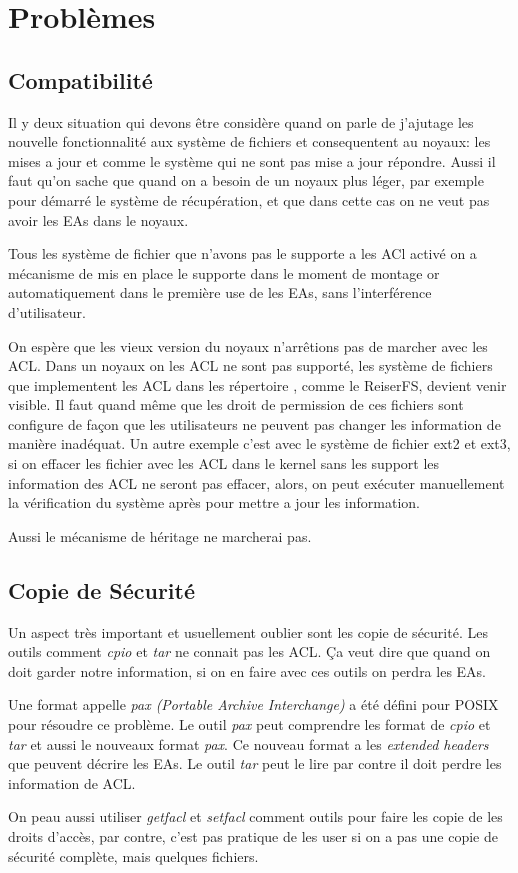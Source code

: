 \section*{Problèmes}

\subsection*{Compatibilité}

Il y deux situation qui devons être considère quand on parle de j'ajutage les nouvelle fonctionnalité aux système de fichiers et consequentent au noyaux: les mises a jour et comme le système qui ne sont pas mise a jour répondre.
Aussi il faut qu'on sache que quand on a besoin de un noyaux plus léger, par exemple pour démarré le système de récupération, et que dans cette cas on ne veut pas avoir les EAs dans le noyaux. 

Tous les système de fichier que n'avons pas le supporte a les ACl activé on a mécanisme de mis en place le supporte dans le moment de montage or automatiquement dans le première use de les EAs, sans l'interférence d'utilisateur. 

On espère que les vieux version du noyaux n'arrêtions pas de marcher avec les ACL. Dans un noyaux on les ACL ne sont pas supporté, les système de fichiers que implementent les ACL dans les répertoire , comme le ReiserFS, devient venir visible. Il faut quand même que les droit de permission de ces fichiers sont configure de façon que les utilisateurs ne peuvent pas changer les information de manière inadéquat. Un autre exemple c'est avec le système de fichier ext2 et ext3, si on effacer les fichier avec les ACL dans le kernel sans les support les information des ACL ne seront pas effacer, alors, on peut exécuter manuellement la vérification du système après pour mettre a jour les information. 
 	
Aussi le mécanisme de héritage ne marcherai pas. 

\subsection*{Copie de Sécurité}

Un aspect très important et usuellement oublier sont les copie de sécurité. Les outils comment \emph{cpio} et \emph{tar} ne connait pas les ACL. Ça veut dire que quand on doit garder notre information, si on en faire avec ces outils on perdra les EAs.

Une format appelle \emph{pax (Portable Archive Interchange)} a été défini pour POSIX pour résoudre ce problème. Le outil \emph{pax} peut comprendre les format de \emph{cpio} et \emph{tar} et aussi le nouveaux format \emph{pax}. Ce nouveau format a les \emph{extended headers} que peuvent décrire les EAs. Le outil \emph{tar} peut le lire par contre il doit perdre les information de ACL. 

On peau aussi utiliser \emph{getfacl} et \emph{setfacl} comment outils pour faire les copie de les droits d'accès, par contre, c'est pas pratique de les user si on a pas une copie de sécurité complète, mais quelques fichiers. 